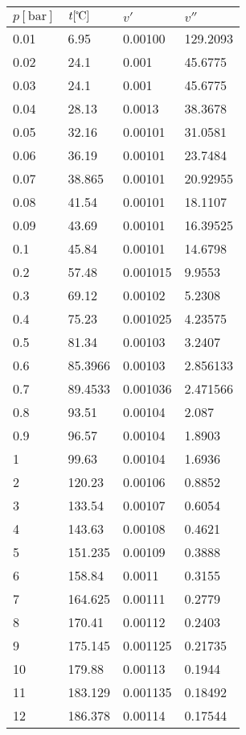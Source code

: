\documentclass[twocolumn]{article}
\begin{document}
\begin{tabular}{l|l|l|l}
$p [\text{bar}] $ & $t [\text{\textcelsius{}}]$ & $v'$ & $v''$ \\ \hline
0.01	&	6.95	&	0.00100	&	129.2093  \\ \hline
0.02	&	24.1	&	0.001	&	45.6775  \\ \hline
0.03	&	24.1	&	0.001	&	45.6775  \\ \hline
0.04	&	28.13	&	0.0013	&	38.3678  \\ \hline
0.05	&	32.16	&	0.00101 &	31.0581  \\ \hline
0.06	&	36.19	&	0.00101	&	23.7484  \\ \hline
0.07	&	38.865	&	0.00101	&	20.92955  \\ \hline
0.08	&	41.54	&	0.00101	&	18.1107  \\ \hline
0.09	&	43.69	&	0.00101	&	16.39525  \\ \hline
0.1	&	45.84	&	0.00101	&	14.6798  \\ \hline
0.2	&	57.48	&	0.001015	&	9.9553  \\ \hline
0.3	&	69.12	&	0.00102	&	5.2308  \\ \hline
0.4	&	75.23	&	0.001025	&	4.23575  \\ \hline
0.5	&	81.34	&	0.00103	&	3.2407  \\ \hline
0.6	&	85.3966&	0.00103&	2.856133\\ \hline
0.7	&	89.4533&	0.001036&	2.471566\\ \hline
0.8	&	93.51	&	0.00104	&	2.087  \\ \hline
0.9	&	96.57	&	0.00104	&	1.8903  \\ \hline
1	&	99.63	&	0.00104	&	1.6936  \\ \hline
2	&	120.23	&	0.00106	&	0.8852  \\ \hline
3	&	133.54	&	0.00107	&	0.6054  \\ \hline
4	&	143.63	&	0.00108	&	0.4621  \\ \hline
5	&	151.235	&	0.00109	&	0.3888  \\ \hline
6	&	158.84	&	0.0011	&	0.3155  \\ \hline
7	&	164.625	&	0.00111	&	0.2779  \\ \hline
8	&	170.41	&	0.00112	&	0.2403  \\ \hline
9	&	175.145	&	0.001125	&	0.21735  \\ \hline
10	&	179.88	&	0.00113	&	0.1944  \\ \hline
11	&	183.129	&	0.001135	&	0.18492  \\ \hline
12	&	186.378	&	0.00114	&	0.17544  \\ \hline

\end{tabular}
\end{document}
